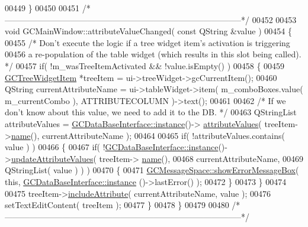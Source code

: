 \begin{DoxyCode}
{00449 \}
00450 
00451 \textcolor{comment}{/*
      --------------------------------------------------------------------------------------*/}
00452 
00453 \textcolor{keywordtype}{void} GCMainWindow::attributeValueChanged( \textcolor{keyword}{const} QString &value )
00454 \{
00455   \textcolor{comment}{/* Don't execute the logic if a tree widget item's activation is triggering}
00456 \textcolor{comment}{    a re-population of the table widget (which results in this slot being
       called). */}
00457   \textcolor{keywordflow}{if}( !m\_wasTreeItemActivated && !value.isEmpty() )
00458   \{
00459     \hyperlink{class_g_c_tree_widget_item}{GCTreeWidgetItem} *treeItem = ui->treeWidget->gcCurrentItem();
00460     QString currentAttributeName = ui->tableWidget->item( m\_comboBoxes.value( 
      m\_currentCombo ), ATTRIBUTECOLUMN )->text();
00461 
00462     \textcolor{comment}{/* If we don't know about this value, we need to add it to the DB. */}
00463     QStringList attributeValues = \hyperlink{class_g_c_data_base_interface_a1baea9c0667aa8b610ec30076fcab84c}{GCDataBaseInterface::instance}()->
      \hyperlink{class_g_c_data_base_interface_a329e17f6c02c62fd554884f2b5a7e2df}{attributeValues}( treeItem->\hyperlink{class_g_c_tree_widget_item_a3af8c66a690cd55986a38b996a375ba4}{name}(), currentAttributeName );
00464 
00465     \textcolor{keywordflow}{if}( !attributeValues.contains( value ) )
00466     \{
00467       \textcolor{keywordflow}{if}( !\hyperlink{class_g_c_data_base_interface_a1baea9c0667aa8b610ec30076fcab84c}{GCDataBaseInterface::instance}()->\hyperlink{class_g_c_data_base_interface_ae4f158875b5a8a109d301f19ce5d21ae}{updateAttributeValues}( treeItem->
      \hyperlink{class_g_c_tree_widget_item_a3af8c66a690cd55986a38b996a375ba4}{name}(),
00468                                                                    
      currentAttributeName,
00469                                                                    QStringList(
       value ) ) )
00470       \{
00471         \hyperlink{namespace_g_c_message_space_ab118b3a133686167617eb955029fd44e}{GCMessageSpace::showErrorMessageBox}( \textcolor{keyword}{this}, \hyperlink{class_g_c_data_base_interface_a1baea9c0667aa8b610ec30076fcab84c}{GCDataBaseInterface::instance}
      ()->lastError() );
00472       \}
00473     \}
00474 
00475     treeItem->\hyperlink{class_g_c_tree_widget_item_a3f1c09758031e2a8fc1ac9336697b3d9}{includeAttribute}( currentAttributeName, value );
00476     setTextEditContent( treeItem );
00477   \}
00478 \}
00479 
00480 \textcolor{comment}{/*
      --------------------------------------------------------------------------------------*/}
}
\end{DoxyCode}
